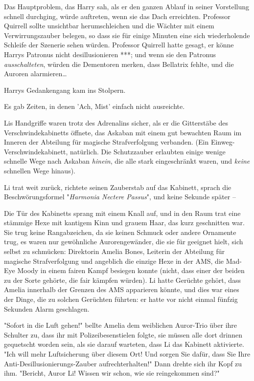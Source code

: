 {Das Hauptproblem, das Harry sah, als er den ganzen Ablauf in seiner Vorstellung schnell durchging, würde auftreten, wenn sie das Dach erreichten. Professor Quirrell sollte unsichtbar herumschleichen und die Wächter mit einem Verwirrungszauber belegen, so dass sie für einige Minuten eine sich wiederholende Schleife der Szenerie sehen würden. Professor Quirrell hatte gesagt, er könne Harrys Patronus nicht desillusionieren ***; und wenn sie den Patronus \emph{ausschalteten}, würden die Dementoren merken, dass Bellatrix fehlte, und die Auroren alarmieren…

Harrys Gedankengang kam ins Stolpern.

Es gab Zeiten, in denen 'Ach, Mist' einfach nicht ausreichte.

Lis Handgriffe waren trotz des Adrenalins sicher, als er die Gitterstäbe des Verschwindekabinetts öffnete, das Askaban mit einem gut bewachten Raum im Inneren der Abteilung für magische Strafverfolgung verbanden. (Ein Einweg-Verschwindekabinett, natürlich. Die Schutzzauber erlaubten einige wenige schnelle Wege nach Askaban \emph{hinein}, die alle stark eingeschränkt waren, und \emph{keine} schnellen Wege hinaus).

Li trat weit zurück, richtete seinen Zauberstab auf das Kabinett, sprach die Beschwörungsformel "\emph{Harmonia Nectere Passus}", und keine Sekunde später --

Die Tür des Kabinetts sprang mit einem Knall auf, und in den Raum trat eine stämmige Hexe mit kantigem Kinn und grauem Haar, das kurz geschnitten war. Sie trug keine Rangabzeichen, da sie keinen Schmuck oder andere Ornamente trug, es waren nur gewöhnliche Aurorengewänder, die sie für geeignet hielt, sich selbst zu schmücken: Direktorin Amelia Bones, Leiterin der Abteilung für magische Strafverfolgung und angeblich die einzige Hexe in der AMS, die Mad-Eye Moody in einem fairen Kampf besiegen konnte (nicht, dass einer der beiden zu der Sorte gehörte, die fair kämpfen würden). Li hatte Gerüchte gehört, dass Amelia innerhalb der Grenzen des AMS apparieren könnte, und dies war eines der Dinge, die zu solchen Gerüchten führten: er hatte vor nicht einmal fünfzig Sekunden Alarm geschlagen.

"Sofort in die Luft gehen!" bellte Amelia dem weiblichen Auror-Trio über ihre Schulter zu, dass ihr mit Polizeibesenstielen folgte, sie müssen alle dort drinnen gequetscht worden sein, als sie darauf warteten, dass Li das Kabinett aktivierte. "Ich will mehr Luftsicherung über diesem Ort! Und sorgen Sie dafür, dass Sie Ihre Anti-Desillusionierungs-Zauber aufrechterhalten!" Dann drehte sich ihr Kopf zu ihm. "Bericht, Auror Li! Wissen wir schon, wie sie reingekommen sind?"

}
